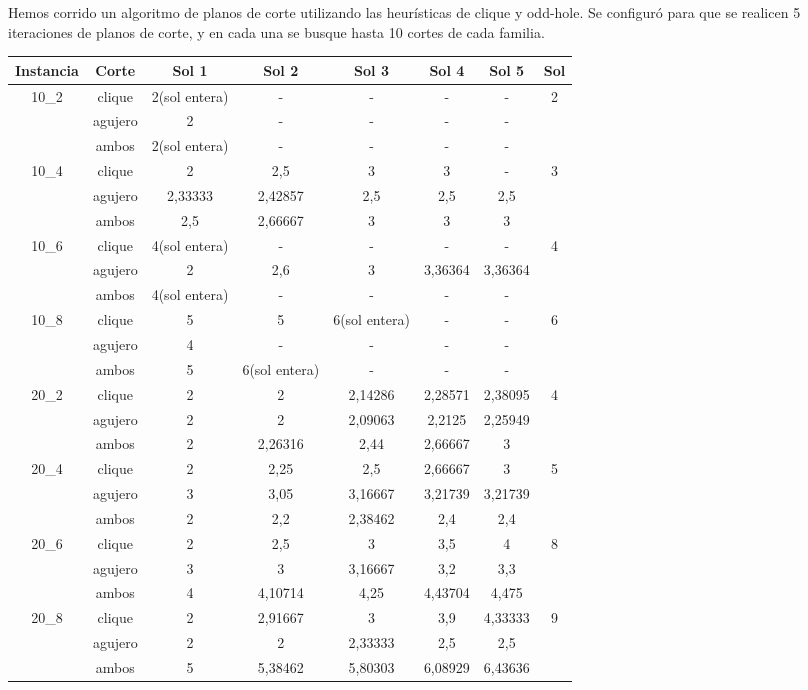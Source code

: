 \documentclass[a4paper]{article}
\begin{document}
Hemos corrido un algoritmo de planos de corte utilizando las heurísticas de clique y odd-hole.  Se configuró para que se realicen 5 iteraciones de planos de corte, y en cada una se busque hasta 10 cortes de cada familia.

\begin{longtable}[!htb]
\begin{center}
\begin{tabular}{|c|c|c|c|c|c|c|c|}
\hline
Instancia&Corte&Sol 1&Sol 2&Sol 3&Sol 4&Sol 5&Sol\\
\hline
\hline
10_2&clique&2(sol entera)&-&-&-&-&2\\
\cline{2-7}
&agujero&2&-&-&-&-&\\
\cline{2-7}
&ambos&2(sol entera)&-&-&-&-&\\
\hline
10_4&clique&2&2,5&3&3&-&3\\
\cline{2-7}
&agujero&2,33333&2,42857&2,5&2,5&2,5&\\
\cline{2-7}
&ambos&2,5&2,66667&3&3&3&\\
\hline
10_6&clique&4(sol entera)&-&-&-&-&4\\
\cline{2-7}
&agujero&2&2,6&3&3,36364&3,36364&\\
\cline{2-7}
&ambos&4(sol entera)&-&-&-&-&\\
\hline
10_8&clique&5&5&6(sol entera)&-&-&6\\
\cline{2-7}
&agujero&4&-&-&-&-&\\
\cline{2-7}
&ambos&5&6(sol entera)&-&-&-&\\
\hline
20_2&clique&2&2&2,14286&2,28571&2,38095&4\\
\cline{2-7}
&agujero&2&2&2,09063&2,2125&2,25949&\\
\cline{2-7}
&ambos&2&2,26316&2,44&2,66667&3&\\
\hline
20_4&clique&2&2,25&2,5&2,66667&3&5\\
\cline{2-7}
&agujero&3&3,05&3,16667&3,21739&3,21739&\\
\cline{2-7}
&ambos&2&2,2&2,38462&2,4&2,4&\\
\hline
20_6&clique&2&2,5&3&3,5&4&8\\
\cline{2-7}
&agujero&3&3&3,16667&3,2&3,3&\\
\cline{2-7}
&ambos&4&4,10714&4,25&4,43704&4,475&\\
\hline
20_8&clique&2&2,91667&3&3,9&4,33333&9\\
\cline{2-7}
&agujero&2&2&2,33333&2,5&2,5&\\
\cline{2-7}
&ambos&5&5,38462&5,80303&6,08929&6,43636&\\

\end{tabular}
\end{center}
\end{longtable}
\end{document}
